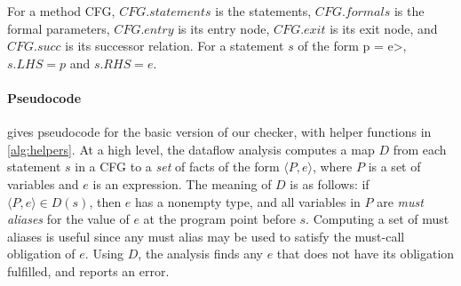 
For a method CFG, $\mathit{CFG.statements}$ is the statements,
$\mathit{CFG.formals}$ is the formal parameters,
$\mathit{CFG.entry}$ is its entry node,
$\mathit{CFG.exit}$ is its exit node, and
$\mathit{CFG.succ}$ is its successor relation.
For a statement
$s$ of the form \<p = e>, $s.LHS = p$ and $s.RHS = e$.

\paragraph{Pseudocode}  gives pseudocode for the
basic version of our checker, with helper functions in \cref{alg:helpers}.  At a
high level, the dataflow analysis computes a map $D$ from each statement $s$ in
a CFG to a \emph{set} of facts of the form $\langle P, e \rangle$, where $P$ is
a set of variables and $e$ is an expression.  The meaning
of $D$ is as follows: if $\langle P, e \rangle
\in D(s)$, then $e$ has a nonempty \MustCall type, and all variables in $P$
are \emph{must aliases} for the value of $e$ at the program point before $s$.
Computing a set of must aliases is useful since any must alias may be used to
satisfy the must-call obligation of $e$.  Using $D$, the analysis finds any $e$
that does not have its \MustCall obligation fulfilled, and reports an error.

